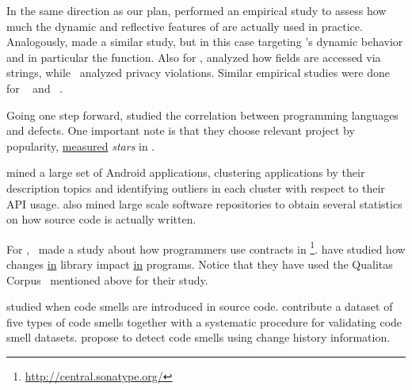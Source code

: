In the same direction as our plan, \cite{callauHowWhyDevelopers2013} performed an empirical study to assess how much the dynamic and reflective features of \smalltalk{} are actually used in practice.
Analogously, \cite{richardsAnalysisDynamicBehavior2010,richardsEvalThatMen2011} made a similar study, but in this case targeting \javascript{}'s dynamic behavior and in particular the  function. 
Also for \javascript{}, \cite{madsenStringAnalysisDynamic2014} analyzed how fields are accessed via strings, while~\cite{jangEmpiricalStudyPrivacyviolating2010} analyzed privacy violations. 
Similar empirical studies were done for \php{}~\cite{hillsEmpiricalStudyPHP2013,dahseExperienceReportEmpirical2015,doyleEmpiricalStudyEvolution2011} and \swift{}~\cite{reboucasEmpiricalStudyUsage2016}.  

Going one step forward, \cite{rayLargescaleStudyProgramming2017} studied the correlation between programming languages and defects. 
One important note is that they choose relevant project by popularity,
\underline{measured} \emph{stars} in \github{}.

\cite{gorlaCheckingAppBehavior2014} mined a large set of Android applications, clustering applications by their description topics and identifying outliers in each cluster with respect to their API usage.
\cite{grechanikEmpiricalInvestigationLargescale2010} also mined large scale software repositories to obtain several statistics on how source code is actually written.

For \java{},~\cite{dietrichContractsWildStudy2017a} made a study about how programmers use contracts in \mavencentral{}\footnote{\url{http://central.sonatype.org/}}.
\cite{dietrichBrokenPromisesEmpirical2014} have studied how changes \underline{in} \api{} library impact \underline{in} \java{} programs.
Notice that they have used the Qualitas Corpus~\cite{temperoQualitasCorpusCurated2010} mentioned above for their study.

\cite{tufanoWhenWhyYour2015,tufanoWhenWhyYour2017} studied when code smells are introduced in source code.
\cite{palombaLandfillOpenDataset2015}
contribute a dataset of five types of code smells together with a systematic procedure for validating code smell datasets.
\cite{palombaDetectingBadSmells2013} propose to detect code smells using change history information.

